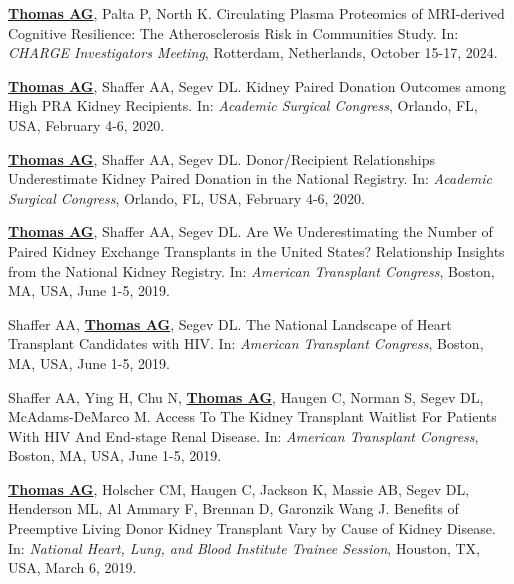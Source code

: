 \documentclass[10pt]{article}
\makeatletter
\newlength{\bibhang}
\newlength{\bibsep}
 {\@listi \global\bibsep\itemsep \global\advance\bibsep by\parsep}
\newenvironment{bibenum*}
  {\renewcommand\labelenumi{[\theenumi]}%
   \etaremune[
     topsep=0pt,
     itemsep=\bibsep,
     parsep=0pt,partopsep=0pt,
     itemindent=-\bibhang,
     leftmargin={\bibhang+\widthof{[999]}}]}
  {\endetaremune}
\makeatother
\begin{document}
\begin{bibenum*}

\item \underline{\textbf{Thomas AG}}, Palta P, North K. 
  Circulating Plasma Proteomics of MRI-derived Cognitive Resilience:
  The Atherosclerosis Risk in Communities Study.
  In: \emph{CHARGE Investigators Meeting},
  Rotterdam, Netherlands, October 15-17, 2024.

\item \underline{\textbf{Thomas AG}}, Shaffer AA, Segev DL.
  Kidney Paired Donation Outcomes among High PRA Kidney Recipients.
  In: \emph{Academic Surgical Congress},
  Orlando, FL, USA, February 4-6, 2020.

\item \underline{\textbf{Thomas AG}}, Shaffer AA, Segev DL.
  Donor/Recipient Relationships Underestimate Kidney Paired
  Donation in the National Registry.
  In: \emph{Academic Surgical Congress},
  Orlando, FL, USA, February 4-6, 2020.


\item \underline{\textbf{Thomas AG}}, Shaffer AA, Segev DL.
  Are We Underestimating the Number of Paired Kidney Exchange
  Transplants in the United States? Relationship Insights
  from the National Kidney Registry.
  In: \emph{American Transplant Congress},
  Boston, MA, USA, June 1-5, 2019.

\item Shaffer AA, \underline{\textbf{Thomas AG}}, Segev DL.
  The National Landscape of Heart Transplant Candidates with HIV.
  In: \emph{American Transplant Congress},
  Boston, MA, USA, June 1-5, 2019.

\item Shaffer AA, Ying H, Chu N, \underline{\textbf{Thomas AG}},
  Haugen C, Norman S, Segev DL, McAdams-DeMarco M.
  Access To The Kidney Transplant Waitlist For Patients With HIV
  And End-stage Renal Disease.
  In: \emph{American Transplant Congress},
  Boston, MA, USA, June 1-5, 2019.

\item \underline{\textbf{Thomas AG}}, Holscher CM, Haugen C,
  Jackson K, Massie AB,
  Segev DL, Henderson ML, Al Ammary F, Brennan D, Garonzik Wang J.
  Benefits of Preemptive Living Donor Kidney Transplant Vary by
  Cause of Kidney Disease.
  In: \emph{National Heart, Lung, and Blood Institute Trainee Session},
  Houston, TX, USA, March 6, 2019.


\end{bibenum*}
\end{document}
